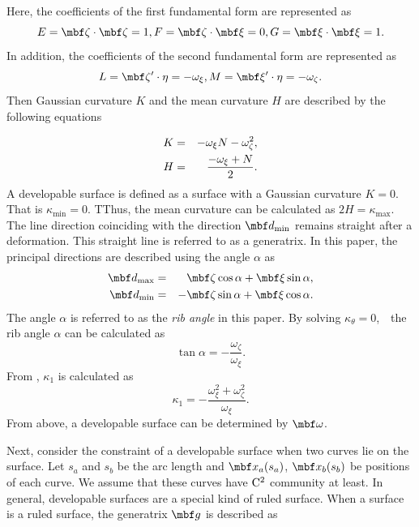 \documentclass[E]{scitrans}
\begin{document}
Here, the coefficients of the first fundamental form are represented as
\begin{equation}
E = \zetavec \cdot \zetavec = 1, F = \zetavec \cdot \xivec = 0, G = \xivec \cdot \xivec = 1.
\end{equation}
In addition, the coefficients of the second fundamental form are represented as
\begin{equation}
L = \zetavec' \cdot \eta = -\omega_{\xi}, M = \xivec' \cdot \eta = -\omega_{\zeta}.
\end{equation}
Then Gaussian curvature $K$ and the mean curvature $H$ are described by the following equations

\begin{eqnarray}
\label{eq:GC_expressed_omega}
K &=& -\omega_{\xi} N - \omega_{\zeta}^2, \\
H &=& {\displaystyle{\frac{-\omega_{\xi}+N}{2}}}.
\end{eqnarray}
A developable surface is defined as a surface with a Gaussian curvature $K = 0$. That is $\kappa_{\min}=0$. TThus, the mean curvature can be calculated as $2H=\kappa_{\max}$. The line direction coinciding with the direction $\mbold{d}_{\min}$ remains straight after a deformation. This straight line is referred to as a generatrix. In this paper, the principal directions are described using the angle $ \alpha $ as 
\begin{eqnarray}\label{eq:d1d2_eq}
\mbold{d}_{\max} &=& \zetavec \cos \alpha + \xivec \sin \alpha, \nonumber \\ 
\mbold{d}_{\min} &=& -\zetavec \sin \alpha + \xivec \cos \alpha.
\end{eqnarray}
The angle $ \alpha $ is referred to as the \textit{rib angle} in this paper.
By solving $ \kappa_{\theta} = 0 $,　the rib angle $ \alpha $ can be calculated as
\begin{equation}\label{eq:alpha_eq}
\tan \alpha = -\frac{\omega_{\zeta}}{\omega_{\xi}}.
\end{equation}
From , $\kappa_1$ is calculated as 
\begin{equation}\label{eq:kappa1_eq}
\kappa_1 = -\frac{\omega_{\xi}^2 + \omega_{\zeta}^2}{\omega_{\xi}}.
\end{equation}
From above, a developable surface can be determined by $\mbold{\omega}$.

Next, consider the constraint of a developable surface when two curves lie on the surface. Let $s_a$ and $s_b$ be the arc length and $\mbold{x}_a(s_a)$, $\mbold{x}_b(s_b)$ be positions of each curve. We assume that these curves have ${\rm C}^2$ community at least. In general, developable surfaces are a special kind of ruled surface. When a surface is a ruled surface, the generatrix $ \mbold{g} $ is described as
\end{document}
